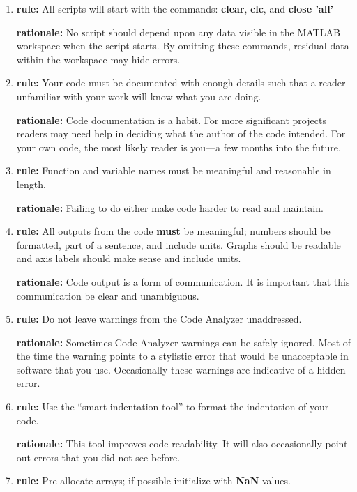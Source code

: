 \documentclass{tufte-book}
\theoremstyle{break}
\begin{document}
\begin{enumerate}
\item \textbf{rule:} All scripts will start with the commands: \textbf{clear}, \textbf{clc}, and \textbf{close 'all'}

\textbf{rationale:} No script should depend upon any data visible in the MATLAB workspace when the script starts.  By omitting these commands, residual data within the workspace may hide errors.

\item \textbf{rule:} Your code must be documented with enough details such that a reader unfamiliar with your work will know what you are doing.

\textbf{rationale:} Code documentation is a habit. For more significant projects readers may need help in deciding what the author of the code intended.  For your own code, the most likely reader is you---a few months into the future.

\item \textbf{rule:} Function and variable names must be meaningful and reasonable in length.

\textbf{rationale:} Failing to do either make code harder to read and maintain.

\item \textbf{rule:} All outputs from the code \underline{\textbf{must}} be meaningful; numbers should be formatted, part of a sentence, and include units. Graphs should be readable and axis labels should make sense and include units.

\textbf{rationale:} Code output is a form of communication. It is important that this communication be clear and unambiguous.

\item \textbf{rule:} Do not leave warnings from the Code Analyzer unaddressed.

\textbf{rationale:} Sometimes Code Analyzer warnings can be safely ignored.  Most of the time the warning points to a stylistic error that would be unacceptable in software that you use. Occasionally these warnings are indicative of a hidden error.

\item \textbf{rule:} Use the ``smart indentation tool'' to format the indentation of your code.

\textbf{rationale:} This tool improves code readability. It will also occasionally point out errors that you did not see before.

\item \textbf{rule:} Pre-allocate arrays; if possible initialize with \textbf{NaN} values.


\end{enumerate}
\end{document}
